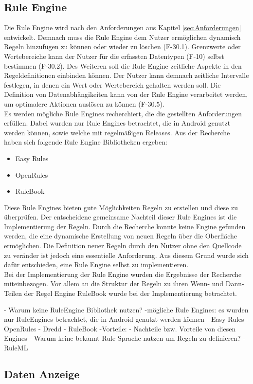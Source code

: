 \subsection{Rule Engine}
Die Rule Engine wird nach den Anforderungen aus Kapitel \ref{sec:Anforderungen} entwickelt. Demnach muss die Rule Engine dem Nutzer ermöglichen dynamisch Regeln hinzufügen zu können oder wieder zu löschen (F-30.1). Grenzwerte oder Wertebereiche kann der Nutzer für die erfassten Datentypen (F-10) selbst bestimmen (F-30.2). Des Weiteren soll die Rule Engine zeitliche Aspekte in den Regeldefinitionen einbinden können. Der Nutzer kann demnach zeitliche Intervalle festlegen, in denen ein Wert oder Wertebereich gehalten werden soll. Die Definition von Datenabhängikeiten kann von der Rule Engine verarbeitet werden, um optimalere Aktionen auslösen zu können (F-30.5).\\
Es werden mögliche Rule Engines recherchiert, die die gestellten Anforderungen erfüllen. Dabei wurden nur Rule Engines betrachtet, die in Android genutzt werden können, sowie welche mit regelmäßigen Releases. Aus der Recherche haben sich folgende Rule Engine Bibliotheken ergeben:
\begin{itemize}
\item Easy Rules \cite{github:easyrules}
\item OpenRules \cite{openrules}
\item RuleBook \cite{github:rulebook}
\end{itemize}
Diese Rule Engines bieten gute Möglichkeiten Regeln zu erstellen und diese zu überprüfen. Der entscheidene gemeinsame Nachteil dieser Rule Engines ist die Implementierung der Regeln. Durch die Recherche konnte keine Engine gefunden werden, die eine dynamische Erstellung von neuen Regeln über die Oberfläche ermöglichen. Die Definition neuer Regeln durch den Nutzer ohne den Quellcode zu veränder ist jedoch eine essentielle Anforderung. Aus diesem Grund wurde sich dafür entschieden, eine Rule Engine selbst zu implementieren.\\
Bei der Implementierung der Rule Engine wurden die Ergebnisse der Recherche miteinbezogen. Vor allem an die Struktur der Regeln zu ihren Wenn- und Dann-Teilen der Regel Engine RuleBook wurde bei der Implementierung betrachtet.


- Warum keine RuleEngine Bibliothek nutzen?
	-mögliche Rule Engines: es wurden nur RuleEngines betrachtet, die in Android genutzt werden können
		- Easy Rules
		- OpenRules
		- Dredd
		- RuleBook
			-Vorteile:  
		- Nachteile bzw. Vorteile von diesen Engines
- Warum keine bekannt Rule Sprache nutzen um Regeln zu definieren? - RuleML

\subsection{Daten Anzeige}
